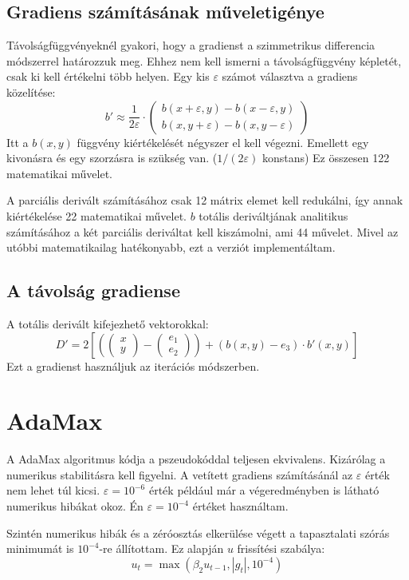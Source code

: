 \subsection{Gradiens számításának műveletigénye}
Távolságfüggvényeknél gyakori, hogy a gradienst a szimmetrikus differencia módszerrel határozzuk meg. Ehhez nem kell ismerni a távolságfüggvény képletét, csak ki kell értékelni több helyen. Egy kis $\varepsilon$ számot választva a gradiens közelítése: 
$$ b' \approx \frac{1}{2\varepsilon} \cdot \begin{pmatrix} b(x+\varepsilon,y) - b(x-\varepsilon,y) \\ b(x,y+\varepsilon) - b(x,y-\varepsilon) \end{pmatrix} $$
Itt a $b(x,y)$ függvény kiértékelését négyszer el kell végezni. Emellett egy kivonásra és egy szorzásra is szükség van. ($1/(2\varepsilon)$ konstans) Ez összesen 122 matematikai művelet. 

A parciális derivált számításához csak 12 mátrix elemet kell redukálni, így annak kiértékelése 22 matematikai művelet. $b$ totális deriváltjának analitikus számításához a két parciális deriváltat kell kiszámolni, ami 44 művelet. Mivel az utóbbi matematikailag hatékonyabb, ezt a verziót implementáltam.

\subsection{A távolság gradiense}
A totális derivált kifejezhető vektorokkal:
$$ D' = 2\left[\left(\begin{pmatrix} x \\ y \end{pmatrix} - \begin{pmatrix} e_1 \\ e_2  \end{pmatrix}\right)  + (b(x,y)-e_3)\cdot b'(x,y) \right]$$
Ezt a gradienst használjuk az iterációs módszerben. 


\section{AdaMax}
A AdaMax algoritmus kódja a pszeudokóddal teljesen ekvivalens. Kizárólag a numerikus stabilitásra kell figyelni. A vetített gradiens számításánál az $\varepsilon$ érték nem lehet túl kicsi. $\varepsilon = 10^{-6}$ érték például már a végeredményben is látható numerikus hibákat okoz. Én $\varepsilon = 10^{-4}$ értéket használtam.

Szintén numerikus hibák és a zéróosztás elkerülése végett a tapasztalati szórás minimumát is $10^{-4}$-re állítottam. Ez alapján $u$ frissítési szabálya: 
$$ u_t = \max (\beta_2 u_{t-1}, |g_t|, 10^{-4}) $$

